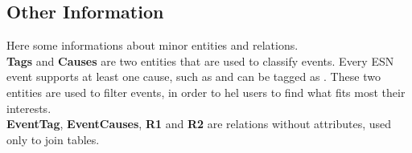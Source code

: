 \subsection{Other Information}

Here some informations about minor entities and relations.\\
\textbf{Tags} and \textbf{Causes} are two entities that are used to classify events. Every ESN event
supports at least one cause, such as %
and can be tagged as %
. These two entities are used to filter events, in order to hel users to find what fits most their interests.\\
\textbf{EventTag}, \textbf{EventCauses}, \textbf{R1} and \textbf{R2} are relations without attributes, used
only to join tables.